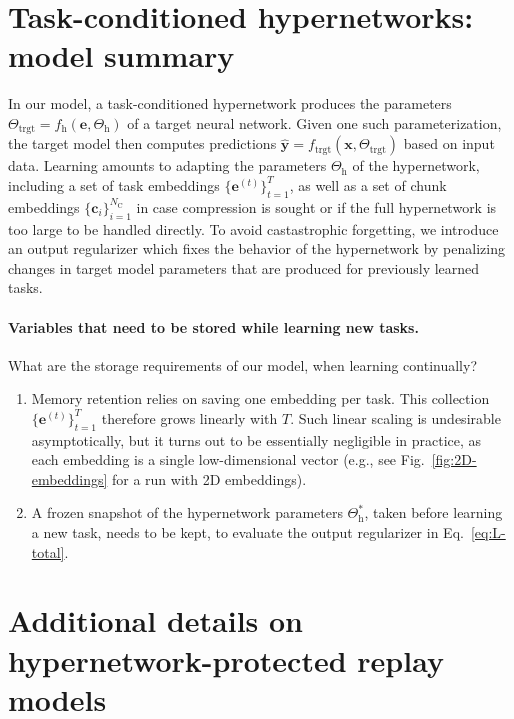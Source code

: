 \documentclass{article}
\begin{document}
\section{Task-conditioned hypernetworks: model summary}
In our model, a task-conditioned hypernetwork produces the parameters $\Theta_\text{trgt} = f_\text{h}(\mathbf{e}, \Theta_\text{h})$ of a target neural network. Given one such parameterization, the target model then computes predictions $\hat{\mathbf{y}} = f_\text{trgt}(\mathbf{x}, \Theta_\text{trgt})$ based on input data. Learning amounts to adapting the parameters $\Theta_\text{h}$ of the hypernetwork, including a set of task embeddings $\{\mathbf{e}^{(t)}\}_{t=1}^T$, as well as a set of chunk embeddings $\{\mathbf{c}_i\}_{i=1}^{N_\text{C}}$ in case compression is sought or if the full hypernetwork is too large to be handled directly. To avoid castastrophic forgetting, we introduce an output regularizer which fixes the behavior of the hypernetwork by penalizing changes in target model parameters that are produced for previously learned tasks. 

\paragraph{Variables that need to be stored while learning new tasks.} What are the storage requirements of our model, when learning continually?
\begin{enumerate}
  \item Memory retention relies on saving one embedding per task. This collection $\{\mathbf{e}^{(t)}\}_{t=1}^T$ therefore grows linearly with $T$. Such linear scaling is undesirable asymptotically, but it turns out to be essentially negligible in practice, as each embedding is a single low-dimensional vector (e.g., see Fig.~\ref{fig:2D-embeddings} for a run with 2D embeddings). 
  \item A frozen snapshot of the hypernetwork parameters $\Theta_\text{h}^*$, taken before learning a new task, needs to be kept, to evaluate the output regularizer in Eq.~\ref{eq:L-total}.
\end{enumerate}

\section{Additional details on hypernetwork-protected replay models}
\label{apx:hypernetwork-replay}
\end{document}
